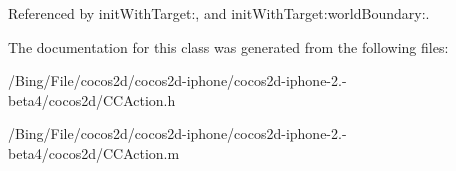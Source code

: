 Referenced by init\-With\-Target\-:, and init\-With\-Target\-:world\-Boundary\-:.



The documentation for this class was generated from the following files\-:\begin{DoxyCompactItemize}
\item 
/\-Bing/\-File/cocos2d/cocos2d-\/iphone/cocos2d-\/iphone-\/2.-\/beta4/cocos2d/C\-C\-Action.\-h\item 
/\-Bing/\-File/cocos2d/cocos2d-\/iphone/cocos2d-\/iphone-\/2.-\/beta4/cocos2d/C\-C\-Action.\-m\end{DoxyCompactItemize}
